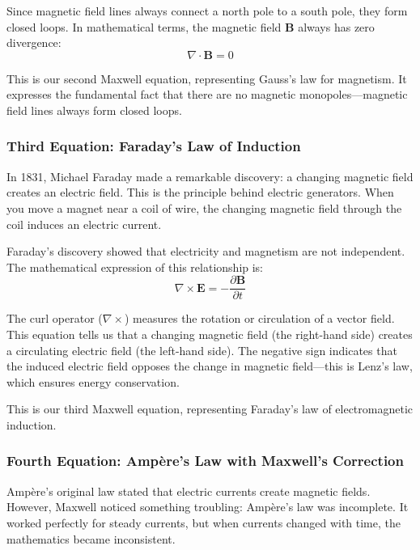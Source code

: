 Since magnetic field lines always connect a north pole to a south pole, they form closed loops. In mathematical terms, the magnetic field $\boldsymbol{B}$ always has zero divergence:
\begin{equation}
\nabla \cdot \boldsymbol{B} = 0 \label{eq:maxwell3}
\end{equation}

This is our second Maxwell equation, representing Gauss's law for magnetism. It expresses the fundamental fact that there are no magnetic monopoles—magnetic field lines always form closed loops.

\subsubsection{Third Equation: Faraday's Law of Induction}

In 1831, Michael Faraday made a remarkable discovery: a changing magnetic field creates an electric field. This is the principle behind electric generators. When you move a magnet near a coil of wire, the changing magnetic field through the coil induces an electric current.

Faraday's discovery showed that electricity and magnetism are not independent. The mathematical expression of this relationship is:
\begin{equation}
\nabla \times \boldsymbol{E} = -\frac{\partial \boldsymbol{B}}{\partial t} \label{eq:maxwell2}
\end{equation}

The curl operator ($\nabla \times$) measures the rotation or circulation of a vector field. This equation tells us that a changing magnetic field (the right-hand side) creates a circulating electric field (the left-hand side). The negative sign indicates that the induced electric field opposes the change in magnetic field—this is Lenz's law, which ensures energy conservation.

This is our third Maxwell equation, representing Faraday's law of electromagnetic induction.

\subsubsection{Fourth Equation: Ampère's Law with Maxwell's Correction}

Ampère's original law stated that electric currents create magnetic fields. However, Maxwell noticed something troubling: Ampère's law was incomplete. It worked perfectly for steady currents, but when currents changed with time, the mathematics became inconsistent.

